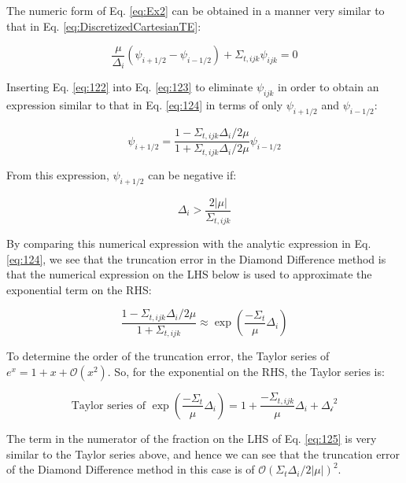 \documentclass[10pt]{article}
\begin{document}
\begin{flushleft}
\begin{tcolorbox}[breakable]
The numeric form of Eq. \eqref{eq:Ex2} can be obtained in a manner very similar to that in Eq. \eqref{eq:DiscretizedCartesianTE}:

\begin{equation}
\label{eq:123}
\frac{\mu}{\Delta_i}(\psi_{i+1/2}-\psi_{i-1/2})+\Sigma_{t,ijk}\psi_{ijk}=0
\end{equation}

Inserting Eq. \eqref{eq:122} into Eq. \eqref{eq:123} to eliminate \(\psi_{ijk}\) in order to obtain an expression similar to that in Eq. \eqref{eq:124} in terms of only \(\psi_{i+1/2}\) and \(\psi_{i-1/2}\):

\begin{equation}
\psi_{i+1/2}=\frac{1-\Sigma_{t,ijk}\Delta_i/2\mu}{1+\Sigma_{t,ijk}\Delta_i/2\mu}\psi_{i-1/2}
\end{equation}

From this expression, \(\psi_{i+1/2}\) can be negative if:

\begin{equation}
\Delta_i>\frac{2|\mu|}{\Sigma_{t,ijk}}
\end{equation}

By comparing this numerical expression with the analytic expression in Eq. \eqref{eq:124}, we see that the truncation error in the Diamond Difference method is that the numerical expression on the LHS below is used to approximate the exponential term on the RHS:

\begin{equation}
\label{eq:125}
\frac{1-\Sigma_{t,ijk}\Delta_i/2\mu}{1+\Sigma_{t,ijk}}\approx\exp{\left(\frac{-\Sigma_t}{\mu}\Delta_i\right)}
\end{equation}

To determine the order of the truncation error, the Taylor series of \(e^x=1+x+\mathscr{O}(x^2)\). So, for the exponential on the RHS, the Taylor series is:

\begin{equation}
\text{Taylor series of } \exp{\left(\frac{-\Sigma_t}{\mu}\Delta_i\right)}=1+\frac{-\Sigma_{t,ijk}}{\mu}\Delta_i+\mathscr{\Delta_i}^2
\end{equation}

The term in the numerator of the fraction on the LHS of Eq. \eqref{eq:125} is very similar to the Taylor series above, and hence we can see that the truncation error of the Diamond Difference method in this case is of \(\mathscr{O}(\Sigma_t\Delta_i/2|\mu|)^2\). 

\end{tcolorbox}


\end{flushleft}
\end{document}
